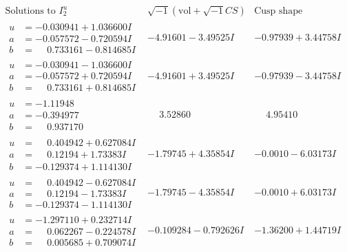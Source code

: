 \documentclass[1p]{elsarticle_modified}
\theoremstyle{definition}
\newcommand{\I}{\sqrt{-1}}
\begin{document}
$$\begin{array}{c|c|c}  
\text{Solutions to }I^u_{2}& \I (\text{vol} + \sqrt{-1}CS) & \text{Cusp shape}\\
 \hline 
\begin{aligned}
u &= -0.030941 + 1.036600 I \\
a &= -0.057572 - 0.720594 I \\
b &= \phantom{-}0.733161 - 0.814685 I\end{aligned}
 & -4.91601 - 3.49525 I & -0.97939 + 3.44758 I \\ \hline\begin{aligned}
u &= -0.030941 - 1.036600 I \\
a &= -0.057572 + 0.720594 I \\
b &= \phantom{-}0.733161 + 0.814685 I\end{aligned}
 & -4.91601 + 3.49525 I & -0.97939 - 3.44758 I \\ \hline\begin{aligned}
u &= -1.11948\phantom{ +0.000000I} \\
a &= -0.394977\phantom{ +0.000000I} \\
b &= \phantom{-}0.937170\phantom{ +0.000000I}\end{aligned}
 & \phantom{-}3.52860\phantom{ +0.000000I} & \phantom{-}4.95410\phantom{ +0.000000I} \\ \hline\begin{aligned}
u &= \phantom{-}0.404942 + 0.627084 I \\
a &= \phantom{-}0.12194 + 1.73383 I \\
b &= -0.129374 + 1.114130 I\end{aligned}
 & -1.79745 + 4.35854 I & -0.0010 - 6.03173 I \\ \hline\begin{aligned}
u &= \phantom{-}0.404942 - 0.627084 I \\
a &= \phantom{-}0.12194 - 1.73383 I \\
b &= -0.129374 - 1.114130 I\end{aligned}
 & -1.79745 - 4.35854 I & -0.0010 + 6.03173 I \\ \hline\begin{aligned}
u &= -1.297110 + 0.232714 I \\
a &= \phantom{-}0.062267 - 0.224578 I \\
b &= \phantom{-}0.005685 + 0.709074 I\end{aligned}
 & -0.109284 - 0.792626 I & -1.36200 + 1.44719 I \\ \hline\begin{aligned}

\end{aligned}
\end{array}$$
\end{document}
